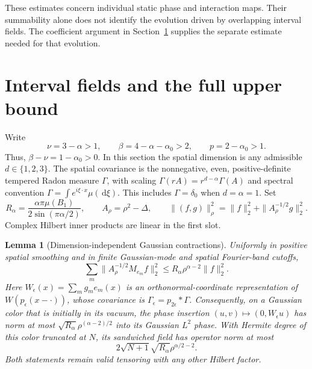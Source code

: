\documentclass[12pt]{article}
\numberwithin{equation}{section}
\newtheorem{lemma}[theorem]{Lemma}
\theoremstyle{definition}
\newcommand{\ud}{\,\mathrm{d}}
\begin{document}
These estimates concern individual static phase and interaction maps.
Their summability alone does not identify the evolution driven by
overlapping interval fields. The coefficient argument in
Section~\ref{S:interval-upper} supplies the separate estimate needed
for that evolution.

\section{Interval fields and the full upper bound}
\label{S:interval-upper}


Write
\[
  \nu=3-\alpha>1,\qquad
  \beta=4-\alpha-\alpha_0>2,\qquad p=2-\alpha_0>1.
\]
Thus, $\beta-\nu=1-\alpha_0>0$.
In this section the spatial dimension is any admissible $d\in\{1,2,3\}$.
The spatial covariance is the nonnegative, even, positive-definite tempered
Radon measure $\Gamma$, with scaling
$\Gamma(rA)=r^{d-\alpha}\Gamma(A)$ and spectral convention
$\Gamma=\int e^{i\xi\cdot x}\mu(\ud\xi)$.
This includes $\Gamma=\delta_0$ when $d=\alpha=1$.
Set
\[
  R_\alpha=\frac{\alpha\pi\mu(B_1)}{2\sin(\pi\alpha/2)},\qquad
  A_\rho=\rho^2-\Delta,\qquad
  \|(f,g)\|_\rho^2=\|f\|_2^2+\|A_\rho^{-1/2}g\|_2^2.
\]
Complex Hilbert inner products are linear in the first slot.

\begin{lemma}[Dimension-independent Gaussian contractions]
  \label{L:interval-contractions}
  Uniformly in positive spatial smoothing and in finite Gaussian-mode
  and spatial Fourier-band cutoffs,
  \begin{equation}\label{E:interval-column}
    \sum_m\|A_\rho^{-1/2}M_{e_m}f\|_2^2
    \le R_\alpha\rho^{\alpha-2}\|f\|_2^2.
  \end{equation}
  Here $W_\epsilon(x)=\sum_m g_me_m(x)$ is an orthonormal-coordinate
  representation of $W(p_\epsilon(x-\cdot))$, whose covariance is
  $\Gamma_\epsilon=p_{2\epsilon}*\Gamma$.
  Consequently, on a Gaussian color that is initially in its vacuum,
  the phase insertion $(u,v)\mapsto(0,W_\epsilon u)$ has norm at most
  $\sqrt{R_\alpha}\rho^{(\alpha-2)/2}$ into its Gaussian $L^2$ phase.
  With Hermite degree of this color truncated at $N$, its sandwiched
  field has operator norm at most
  \begin{equation}\label{E:interval-fock}
    2\sqrt{N+1}\sqrt{R_\alpha}\rho^{\alpha/2-2}.
  \end{equation}
  Both statements remain valid tensoring with any other Hilbert factor.
\end{lemma}
\end{document}
